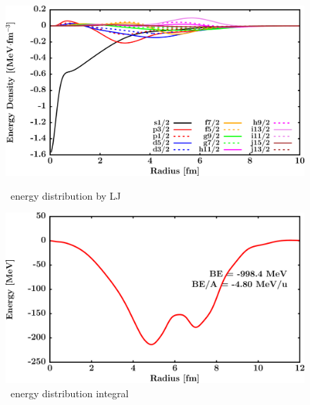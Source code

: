 \begin{figure}[hbtp]
    \centering
    \begin{minipage}{0.45\textwidth}
        \centering
        \includegraphics[width=\textwidth]{figures/pb208_EnergyDist.png}
        \caption*{\pbEight\ energy distribution by LJ}
        \label{DOMFitData_pb208_proton_energyDistInt}
    \end{minipage}\hspace{6pt}
    \begin{minipage}{0.45\textwidth}
        \centering
        \includegraphics[width=\textwidth]{figures/pb208_EnergyDistIntegral.png}
        \caption*{\pbEight\ energy distribution integral}
        \label{DOMFitData_pb208_neutron_energyDistInt}
    \end{minipage}
\end{figure}
\vspace{0.4in}
